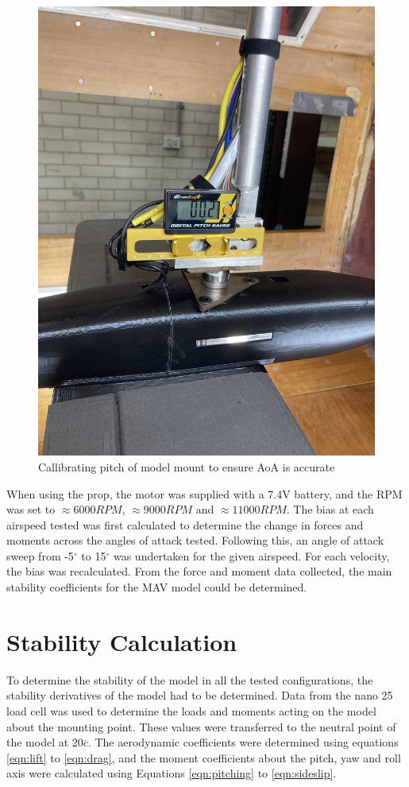 \begin{figure}[H]
    \centering
    \includegraphics[scale=0.05]{04_Methodology/Figs/pitchGauge.jpg}
    \caption{Callibrating pitch of model mount to ensure \acrshort{AoA} is accurate}
    \label{fig:pitchGauge}
\end{figure}


When using the prop, the motor was supplied with a 7.4V battery, and the RPM was set to $\approx 6000 RPM$, $\approx 9000RPM$ and $\approx 11000 RPM$. The bias at each airspeed tested was first calculated to determine the change in forces and moments across the angles of attack tested. Following this, an angle of attack sweep from -5$^{\circ}$ to 15$^{\circ}$ was undertaken for the given airspeed. For each velocity, the bias was recalculated. From the force and moment data collected, the main stability coefficients for the MAV model could be determined.


\section{Stability Calculation}
To determine the stability of the model in all the tested configurations, the stability derivatives of the model had to be determined. Data from the nano 25 load cell was used to determine the loads and moments acting on the model about the mounting point. These values were transferred to the neutral point of the model at 20$\overline{c}$. The aerodynamic coefficients were determined using equations \ref{eqn:lift} to \ref{eqn:drag}, and the moment coefficients about the pitch, yaw and roll axis were calculated using Equations \ref{eqn:pitching} to \ref{eqn:sideslip}. 



